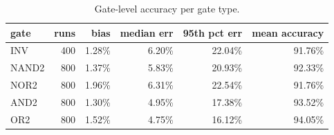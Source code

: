 \begin{table}[H]
\centering
{\small
\begin{tabular}{lrrrrr}
\toprule
gate & runs & bias & median err & 95th pct err & mean accuracy \\
\midrule
INV & 400 & 1.28\% & 6.20\% & 22.04\% & 91.76\% \\
NAND2 & 800 & 1.37\% & 5.83\% & 20.93\% & 92.33\% \\
NOR2 & 800 & 1.96\% & 6.31\% & 22.54\% & 91.76\% \\
AND2 & 800 & 1.30\% & 4.95\% & 17.38\% & 93.52\% \\
OR2 & 800 & 1.52\% & 4.75\% & 16.12\% & 94.05\% \\
\bottomrule
\end{tabular}
}
\caption{Gate-level accuracy per gate type.}
\label{tab:bygate}
\end{table}

